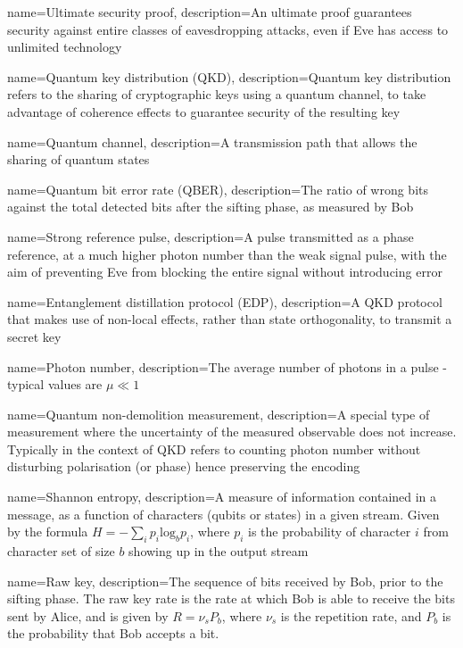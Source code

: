  {
name={Ultimate security proof},
description={An ultimate proof guarantees security against entire classes of eavesdropping attacks, even if Eve has access to unlimited technology}
}

 {name={Quantum key distribution (QKD)},
description={Quantum key distribution refers to the sharing of cryptographic keys using a quantum channel, to take advantage of coherence effects to guarantee security of the resulting key}
}

 {
name={Quantum channel},
description={A transmission path that allows the sharing of quantum states}
}

 {
name={Quantum bit error rate (QBER)},
description={The ratio of wrong bits against the total detected bits after the sifting phase, as measured by Bob}
}

 {
name={Strong reference pulse},
description={A pulse transmitted as a phase reference, at a much higher photon number than the weak signal pulse, with the aim of preventing Eve from blocking the entire signal without introducing error}
}

 {
name={Entanglement distillation protocol (EDP)},
description={A QKD protocol that makes use of non-local effects, rather than state orthogonality, to transmit a secret key}
}

 {
name={Photon number},
description={The average number of photons in a pulse - typical values are $\mu \ll 1$}
}

 {
name={Quantum non-demolition measurement},
description={A special type of measurement where the uncertainty of the measured observable does not increase. Typically in the context of QKD refers to counting photon number without disturbing polarisation (or phase) hence preserving the encoding}
}

 {
name={Shannon entropy},
description={A measure of information contained in a message, as a function of characters (qubits or states) in a given stream. Given by the formula $H = -\sum_i p_i \mathrm{log}_b p_i$, where $p_i$ is the probability of character $i$ from character set of size $b$ showing up in the output stream}
}

 {
name={Raw key},
description={The sequence of bits received by Bob, prior to the sifting phase. The raw key rate is the rate at which Bob is able to receive the bits sent by Alice, and is given by $R = \nu_s P_b$, where $\nu_s$ is the repetition rate, and $P_b$ is the probability that Bob accepts a bit.}
}
